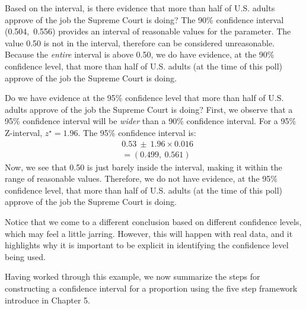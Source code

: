 \begin{examplewrap}
\begin{nexample}{Based on the interval, is there evidence that more than half of U.S. adults approve of the job the Supreme Court is doing?}
\label{JobSupremeCourtDoingEvidenceExample}
The 90\% confidence interval (0.504,\ 0.556) provides an interval of reasonable values for the parameter.  The value 0.50 is not in the interval, therefore can be considered unreasonable.  Because the \emph{entire} interval is above 0.50, we do have evidence, at the 90\% confidence level, that more than half of U.S. adults (at the time of this poll) approve of the job the Supreme Court is doing.
\end{nexample}
\end{examplewrap}

\begin{examplewrap}
\begin{nexample}{Do we have evidence at the 95\% confidence level that more than half of U.S. adults approve of the job the Supreme Court is doing?}
\label{JobSupremeCourtDoingWrapUpExample}
First, we observe that a 95\% confidence interval will be \emph{wider} than a 90\% confidence interval.  For a 95\% Z-interval, $z^{\star}=1.96$.  The 95\% confidence interval is:
\begin{align*}
&0.53\ \pm\  1.96 \times 0.016 \\
&= (0.499,\ 0.561)
\end{align*}
Now, we see that 0.50 is just barely inside the interval, making it within the range of reasonable values.  Therefore, we do not have evidence, at the 95\% confidence level, that more than half of U.S. adults (at the time of this poll) approve of the job the Supreme Court is doing.

Notice that we come to a different conclusion based on different confidence levels, which may feel a little jarring.  However, this will happen with real data, and it highlights why it is important to be explicit in identifying the confidence level being used.
\end{nexample}
\end{examplewrap}


Having worked through this example, we now summarize the steps for constructing a confidence interval for a proportion using the five step framework introduce in Chapter 5.


